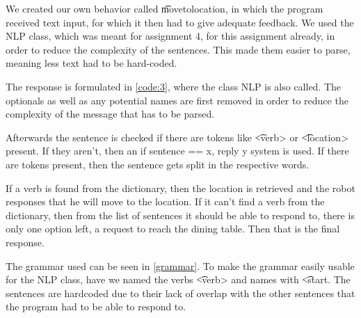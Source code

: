 
We created our own behavior called \t{movetolocation}, in which the program received text input, for which it then had to give adequate feedback. We used the NLP class, which was meant for assignment 4, for this assignment already, in order to reduce the complexity of the sentences. This made them easier to parse, meaning less text had to be hard-coded.



The response is formulated in \ref{code:3}, where the class NLP is also called. The optionals as well as any potential names are first removed in order to reduce the complexity of the message that has to be parsed. 

Afterwards the sentence is checked if there are tokens like \t{<verb>} or \t{<location>} present. If they aren't, then an if sentence == x, reply y system is used. If there are tokens present, then the sentence gets split in the respective words. 

If a verb is found from the dictionary, then the location is retrieved and the robot responses that he will move to the location. If it can't find a verb from the dictionary, then from the list of sentences it should be able to respond to, there is only one option left, a request to reach the dining table. Then that is the final response.



The grammar used can be seen in \ref{grammar}. To make the grammar easily usable for the NLP class, have we named the verbs \t{<verb>} and names with \t{<start}. The sentences are hardcoded due to their lack of overlap with the other sentences that the program had to be able to respond to.